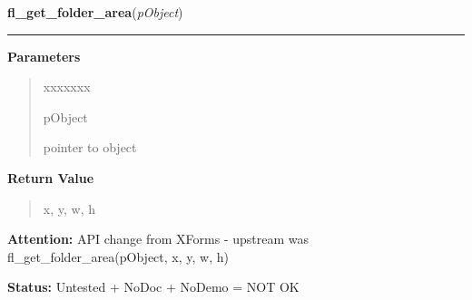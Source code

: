 \hspace{.8\funcindent}\begin{boxedminipage}{\funcwidth}

    \raggedright \textbf{fl\_get\_folder\_area}(\textit{pObject})

    \vspace{-1.5ex}

    \rule{\textwidth}{0.5\fboxrule}
\setlength{\parskip}{2ex}
\setlength{\parskip}{1ex}
      \textbf{Parameters}
      \vspace{-1ex}

      \begin{quote}
        \begin{Ventry}{xxxxxxx}

          \item[pObject]

          pointer to object

        \end{Ventry}

      \end{quote}

      \textbf{Return Value}
    \vspace{-1ex}

      \begin{quote}
      x, y, w, h

      \end{quote}

\textbf{Attention:} API change from XForms - upstream was fl\_get\_folder\_area(pObject, x, y, 
w, h)



\textbf{Status:} Untested + NoDoc + NoDemo = NOT OK



    \end{boxedminipage}

    \label{xformslib:library:fl_replace_folder_bynumber}

    \vspace{0.5ex}

